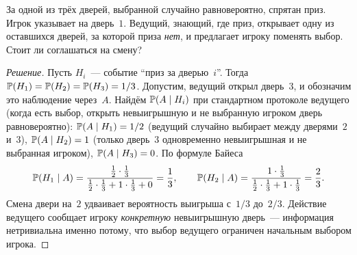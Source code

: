 \begin{problem}
\label{prob:monty-hall}
За одной из трёх дверей, выбранной случайно равновероятно, спрятан приз. Игрок указывает на дверь~$1$. Ведущий, знающий, где приз, открывает одну из оставшихся дверей, за которой приза \emph{нет}, и предлагает игроку поменять выбор. Стоит ли соглашаться на смену?
\end{problem}

\begin{proof}[Решение]
Пусть $H_i$~--- событие ``приз за дверью~$i$''. Тогда $\mathbb{P}(H_1) = \mathbb{P}(H_2) = \mathbb{P}(H_3) = 1/3$. Допустим, ведущий открыл дверь~$3$, и обозначим это наблюдение через~$A$. Найдём $\mathbb{P}(A \mid H_i)$ при стандартном протоколе ведущего (когда есть выбор, открыть невыигрышную и не выбранную игроком дверь равновероятно): $\mathbb{P}(A \mid H_1) = 1/2$ (ведущий случайно выбирает между дверями~$2$ и~$3$), $\mathbb{P}(A \mid H_2) = 1$ (только дверь~$3$ одновременно невыигрышная и не выбранная игроком), $\mathbb{P}(A \mid H_3) = 0$. По формуле Байеса
\[
  \mathbb{P}(H_1 \mid A) = \frac{\tfrac{1}{2} \cdot \tfrac{1}{3}}{\tfrac{1}{2} \cdot \tfrac{1}{3} + 1 \cdot \tfrac{1}{3} + 0} = \frac{1}{3},
  \qquad
  \mathbb{P}(H_2 \mid A) = \frac{1 \cdot \tfrac{1}{3}}{\tfrac{1}{2} \cdot \tfrac{1}{3} + 1 \cdot \tfrac{1}{3}} = \frac{2}{3}.
\]
Смена двери на~$2$ удваивает вероятность выигрыша с~$1/3$ до~$2/3$. Действие ведущего сообщает игроку \emph{конкретную} невыигрышную дверь~--- информация нетривиальна именно потому, что выбор ведущего ограничен начальным выбором игрока.
\end{proof}
